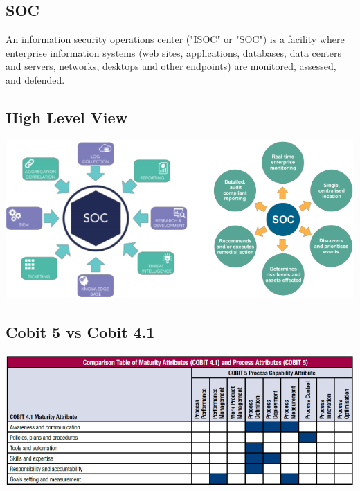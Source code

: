 \documentclass[a4]{article}
\begin{document}
\begin{multicols}{3}
\section{SOC}
An information security operations center ("ISOC" or "SOC") is a facility where enterprise information systems 
(web sites, applications, databases, data centers and servers, networks, desktops and other endpoints) 
are monitored, assessed, and defended. 

\subsection{High Level View}
\begin{center}
    \begin{minipage}{\columnwidth}
        \includegraphics[width=\columnwidth]{soc-high-level.png}
    \end{minipage}
\end{center}

\subsection{Cobit 5 vs Cobit 4.1}
\begin{center}
    \begin{minipage}{\columnwidth}
        \includegraphics[width=\columnwidth]{cobit5-vs-cobit41.png}
    \end{minipage}
\end{center}


\end{multicols}
\end{document}
